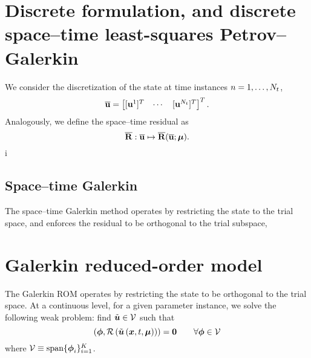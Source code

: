 \documentclass[3p,computermodern,10pt]{elsarticle}
\begin{document}
\section{Discrete formulation, and discrete space--time least-squares Petrov--Galerkin}
We consider the discretization of the state at time instances $n=1,\ldots,N_t$,
$$\overline{\mathbf{u}} = \begin{bmatrix} [\mathbf{u}^1]^T & \cdots & [\mathbf{u}^{N_t}]^T \end{bmatrix}^T.$$
Analogously, we define the space--time residual as
$$\overline{\mathbf{R}}: \overline{\mathbf{u}} \mapsto \overline{\mathbf{R}}(\overline{\mathbf{u}};\boldsymbol \mu).$$i
\subsection{Space--time Galerkin}
The space--time Galerkin method operates by restricting the state to the trial space, and enforces the residual to be orthogonal to the trial subspace,


\section{Galerkin reduced-order model}
The Galerkin ROM operates by restricting the state to be orthogonal to the trial space. At a continuous level, for a given parameter instance, we solve the following weak problem: find $\tilde{\boldsymbol u} \in \mathcal{V}$ such that
$$\left( \boldsymbol \phi, \mathcal{R}\left(\tilde{\boldsymbol u}\left(\boldsymbol x, t,\boldsymbol \mu\right)\right) \right) = \boldsymbol 0 \qquad \forall \boldsymbol \phi \in \mathcal{V}$$
where $\mathcal{V} \equiv \text{span}\{ \boldsymbol \phi_i\}_{i=1}^{K}$.
\end{document}
